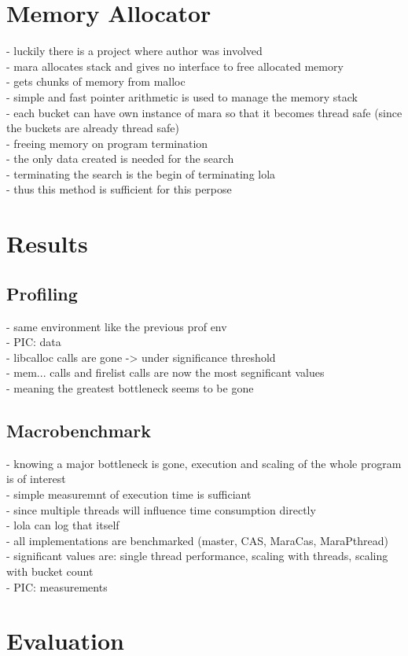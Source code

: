 \section{Memory Allocator}
- luckily there is a project where author was involved\\
- mara allocates stack and gives no interface to free allocated memory\\
- gets chunks of memory from malloc\\
- simple and fast pointer arithmetic is used to manage the memory stack\\
- each bucket can have own instance of mara so that it becomes thread safe (since the buckets are already thread safe)\\
- freeing memory on program termination\\
- the only data created is needed for the search\\
- terminating the search is the begin of terminating lola\\
- thus this method is sufficient for this perpose\\ 

\section{Results}
\subsection{Profiling}
- same environment like the previous prof env\\
- PIC: data\\
- libcalloc calls are gone -> under significance threshold\\
- mem... calls and firelist calls are now the most segnificant values\\
- meaning the greatest bottleneck seems to be gone\\

\subsection{Macrobenchmark}
- knowing a major bottleneck is gone, execution and scaling of the whole program is of interest\\
- simple measuremnt of execution time is sufficiant\\
- since multiple threads will influence time consumption directly\\
- lola can log that itself\\
- all implementations are benchmarked (master, CAS, MaraCas, MaraPthread)\\
- significant values are: single thread performance, scaling with threads, scaling with bucket count\\
- PIC: measurements\\

\section{Evaluation}